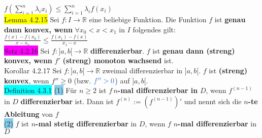 \documentclass[landscape, 10pt]{article}
\newcommand{\R}{\mathbb{R}}
\begin{document}
\begin{multicols}{3}
{                     $f(\sum_{i=1}^n\lambda_i x_i)
                     \leqslant\sum_{i=1}^n\lambda_if(x_i)$}\\
              \colorbox{yellow}{Lemma 4.2.15} 
                     Sei \textcolor{NavyBlue}{$f:I\longrightarrow\R$} 
                     eine beliebige Funktion. Die Funktion \textcolor{NavyBlue}{$f$}
                     ist \textbf{genau dann konvex, wenn} 
                     \textcolor{NavyBlue}{$\forall x_0<x<x_1$} in 
                     \textcolor{NavyBlue}{$I$}
                     folgendes gilt: \textcolor{NavyBlue}{
                     $\frac{f(x)-f(x_0)}{x-x_0}\leqslant\frac{f(x_1)-f(x)}{x_1-x}$}\\ 
              \colorbox{magenta}{Satz 4.2.16} 
                     Sei \textcolor{NavyBlue}{$f:]a,b[\longrightarrow\R$}
                     \textbf{differenzierbar}. 
                     \textcolor{NavyBlue}{$f$} ist 
                     \textbf{genau dann (streng) konvex, wenn} 
                     \textcolor{NavyBlue}{$f'$} \textbf{(streng) monoton
                     wachsend} ist.\\
              \colorbox{BurntOrange}{Korollar 4.2.17} 
                     Sei \textcolor{NavyBlue}{$f:]a,b[\longrightarrow\R$}
                     zweimal differenzierbar in \textcolor{NavyBlue}{$]a,b[$}. 
                     \textcolor{NavyBlue}{$f$} ist \textbf{(streng) konvex}, 
                     wenn \textcolor{NavyBlue}{$f''\geqslant0$} (bzw. 
                     $\textcolor{NavyBlue}{f''>0}$) auf 
                     \textcolor{NavyBlue}{$]a,b[$}.\\
              \colorbox{cyan}{Definition 4.3.1} 
                     \colorbox{SkyBlue}{(1)} Für $n\geqslant2$ ist 
                            $f\,n$\textbf{-mal differenzierbar in} $D$, wenn 
                            \textcolor{NavyBlue}{$f^{(n-1)}$} in \textcolor{NavyBlue}{$D$}
                            \textbf{differenzierbar} ist. 
                            Dann ist \textcolor{NavyBlue}{$f^{(n)}:=(f^{(n-1)})'$} 
                            und nennt sich die $n$\textbf{-te Ableitung} von 
                            \textcolor{NavyBlue}{$f$}\\
                     \colorbox{SkyBlue}{(2)} \textcolor{NavyBlue}{$f$} 
                            ist $n$\textbf{-mal stetig differenzierbar} in 
                            \textcolor{NavyBlue}{$D$}, 
                            wenn \textcolor{NavyBlue}{$f$} 
                            \textbf{$n$-mal differenzierbar} in
                            \textcolor{NavyBlue}{$D$}

\end{multicols}
\end{document}
